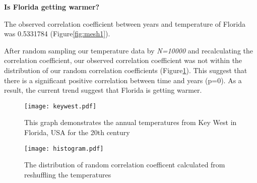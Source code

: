 \documentclass[12pt]{article}
\begin{document}
\textbf{Is Florida getting warmer?}





The observed correlation coefficient between years and temperature of Florida was 0.5331784 (Figure\ref{fig:mesh1}).





After random sampling our temperature data by \textit{N=10000} and recalculating the correlation coefficient, our observed correlation coefficient was not within the distribution of our random correlation coefficients (Figure\ref{fig:mesh2}). This suggest that there is a 
significant positive correlation between time and years (p=0). As a result, the current trend suggest that Florida is getting warmer. 

    \begin{figure}[H]
    \centering
    \begin{minipage}{.5\textwidth}
        \texttt{[image: keywest.pdf]}
        \centering
        \caption{This graph demonstrates the annual temperatures from Key West in Florida, USA for the 20th century}
        \label{fig:mesh1}
    \end{minipage}%
    \begin{minipage}{.5\textwidth}
        \texttt{[image: histogram.pdf]}
        \centering
        \caption{The distribution of random correlation coefficent calculated from reshuffling the temperatures}
        \label{fig:mesh2}
    \end{minipage}
    \end{figure}
\end{document}
